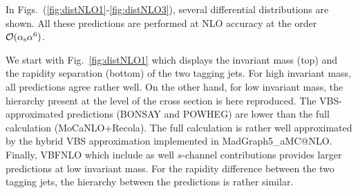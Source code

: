 In Figs.~(\ref{fig:distNLO1}-\ref{fig:distNLO3}), several differential distributions are shown.
All these predictions are performed at NLO accuracy at the order $\mathcal{O}(\alpha_{\rm s}\alpha^6)$.

We start with Fig.~\ref{fig:distNLO1} which displays the invariant mass (top) and the rapidity separation (bottom) of the two tagging jets.
For high invariant mass, all predictions agree rather well.
On the other hand, for low invariant mass, the hierarchy present at the level of the cross section is here reproduced.
The VBS-approximated predictions ({\sc BONSAY} and {\sc POWHEG}) are lower than the full calculation ({\sc MoCaNLO}+{\sc Recola}).
The full calculation is rather well approximated by the hybrid VBS approximation implemented in {\sc MadGraph5\_aMC@NLO}.
Finally, {\sc VBFNLO} which include as well $s$-channel contributions provides larger predictions at low invariant mass.
For the rapidity difference between the two tagging jets, the hierarchy between the predictions is rather similar.


